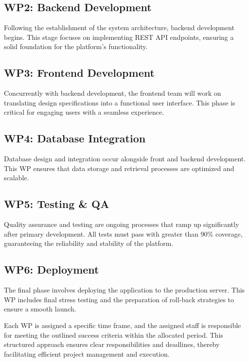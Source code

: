 \documentclass[12pt]{report}
\begin{document}
\subsection{WP2: Backend Development}
Following the establishment of the system architecture, backend development begins. This stage focuses on implementing REST API endpoints, ensuring a solid foundation for the platform's functionality.

\subsection{WP3: Frontend Development}
Concurrently with backend development, the frontend team will work on translating design specifications into a functional user interface. This phase is critical for engaging users with a seamless experience.

\subsection{WP4: Database Integration}
Database design and integration occur alongside front and backend development. This WP ensures that data storage and retrieval processes are optimized and scalable.

\subsection{WP5: Testing \& QA}
Quality assurance and testing are ongoing processes that ramp up significantly after primary development. All tests must pass with greater than 90\% coverage, guaranteeing the reliability and stability of the platform.

\subsection{WP6: Deployment}
The final phase involves deploying the application to the production server. This WP includes final stress testing and the preparation of roll-back strategies to ensure a smooth launch.

Each WP is assigned a specific time frame, and the assigned staff is responsible for meeting the outlined success criteria within the allocated period. This structured approach ensures clear responsibilities and deadlines, thereby facilitating efficient project management and execution.
\end{document}
